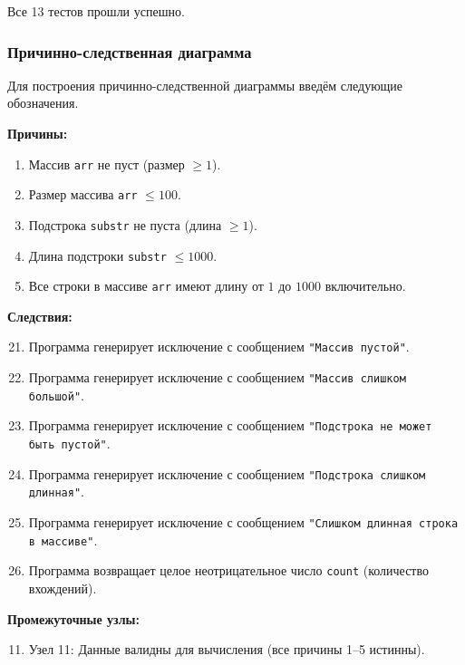 \documentclass{article}[14pt]
\begin{document}
Все 13 тестов прошли успешно.

\subsubsection{Причинно-следственная диаграмма}

Для построения причинно-следственной диаграммы введём следующие обозначения.

\textbf{Причины:}
\begin{enumerate}
    \item Массив \texttt{arr} не пуст (размер $\ge 1$).
    \item Размер массива \texttt{arr} $\le 100$.
    \item Подстрока \texttt{substr} не пуста (длина $\ge 1$).
    \item Длина подстроки \texttt{substr} $\le 1000$.
    \item Все строки в массиве \texttt{arr} имеют длину от $1$ до $1000$ включительно.
\end{enumerate}

\textbf{Следствия:}
\begin{enumerate}
    \setcounter{enumi}{20}
    \item Программа генерирует исключение с сообщением \texttt{"Массив пустой"}.
    \item Программа генерирует исключение с сообщением \texttt{"Массив слишком большой"}.
    \item Программа генерирует исключение с сообщением \texttt{"Подстрока не может быть пустой"}.
    \item Программа генерирует исключение с сообщением \texttt{"Подстрока слишком длинная"}.
    \item Программа генерирует исключение с сообщением \texttt{"Слишком длинная строка в массиве"}.
    \item Программа возвращает целое неотрицательное число \texttt{count} (количество вхождений).
\end{enumerate}

\textbf{Промежуточные узлы:}
\begin{enumerate}
    \setcounter{enumi}{10}
    \item Узел 11: Данные валидны для вычисления (все причины 1--5 истинны).
\end{enumerate}
\end{document}
